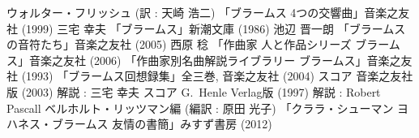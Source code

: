
\begin{thebibliography}{99}
	 ウォルター・フリッシュ (訳 : 天崎 浩二) 「ブラームス 4つの交響曲」音楽之友社 (1999)
	 三宅 幸夫 「ブラームス」新潮文庫 (1986)
	 池辺 晋一朗 「ブラームスの音符たち」音楽之友社 (2005)
	 西原 稔 「作曲家 人と作品シリーズ ブラームス」音楽之友社 (2006)
	 「作曲家別名曲解説ライブラリー ブラームス」音楽之友社 (1993)
	 「ブラームス回想録集」全三巻, 音楽之友社 (2004)
	 スコア 音楽之友社版 (2003) 解説 : 三宅 幸夫
	 スコア G.~Henle Verlag版 (1997) 解説 : Robert Pascall
	 ベルホルト・リッツマン編 (編訳 : 原田 光子) 「クララ・シューマン ヨハネス・ブラームス 友情の書簡」みすず書房 (2012)
\end{thebibliography}
